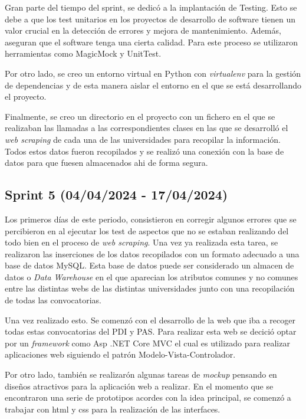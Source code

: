 Gran parte del tiempo del sprint, se dedicó a la implantación de Testing. Esto se debe a que los test unitarios en los proyectos de desarrollo de software tienen un valor crucial en la detección de errores y mejora de mantenimiento. Además, aseguran que el software tenga una cierta calidad. Para este proceso se utilizaron herramientas como MagicMock y UnitTest.

Por otro lado, se creo un entorno virtual en Python con \textit{virtualenv} para la gestión de dependencias y de esta manera aislar el entorno en el que se está desarrollando el proyecto.

Finalmente, se creo un directorio en el proyecto con un fichero en el que se realizaban las llamadas a las correspondientes clases en las que se desarrolló el \textit{web scraping} de cada una de las universidades para recopilar la información. Todos estos datos fueron recopilados y se realizó una conexión con la base de datos para que fuesen almacenados ahi de forma segura.


\subsection{Sprint 5 (04/04/2024 -
17/04/2024)}
Los primeros días de este periodo, consistieron en corregir algunos errores que se percibieron en al ejecutar los test de aspectos que no se estaban realizando del todo bien en el proceso de \textit{web scraping}. Una vez ya realizada esta tarea, se realizaron las inserciones de los datos recopilados con un formato adecuado a una base de datos MySQL. Esta base de datos puede ser considerado un almacen de datos o \textit{Data Warehouse} en el que aparecian los atributos comunes y no comunes entre las distintas webs de las distintas universidades junto con una recopilación de todas las convocatorias.

Una vez realizado esto. Se comenzó con el desarrollo de la web que iba a recoger todas estas convocatorias del PDI y PAS. Para realizar esta web se decició optar por un \textit{framework} como Asp .NET Core MVC el cual es utilizado para realizar aplicaciones web siguiendo el patrón Modelo-Vista-Controlador.

Por otro lado, también se realizarón algunas tareas de \textit{mockup} pensando en diseños atractivos para la aplicación web a realizar. En el momento que se encontraron una serie de prototipos acordes con la idea principal, se comenzó a trabajar con html y css para la realización de las interfaces.

